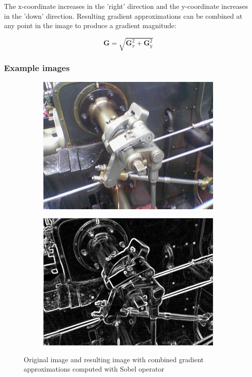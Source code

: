 The x-coordinate increases in the 'right' direction and the y-coordinate increases in the 'down' direction. Resulting gradient approximations can be combined at any point in the image to produce a gradient magnitude:

\begin{equation}
    \mathbf{G} = \sqrt{\mathbf{G}_x^2 + \mathbf{G}_y^2}
    \label{eq:sobelGradientMagnitude}
\end{equation}

\subsubsection{Example images}

\begin{figure}[H]
    \centering
    \begin{subfigure}[b]{0.45\textwidth}
        \includegraphics[width=\textwidth]{Content/Images/sobel_example_before.png}
    \end{subfigure}
    \begin{subfigure}[b]{0.45\textwidth}
        \includegraphics[width=\textwidth]{Content/Images/sobel_example_after.png}
    \end{subfigure}
    \caption{Original image \cite{sobel_example_before} and resulting image with combined gradient approximations computed with Sobel operator \cite{sobel_example_after}}
\end{figure}

